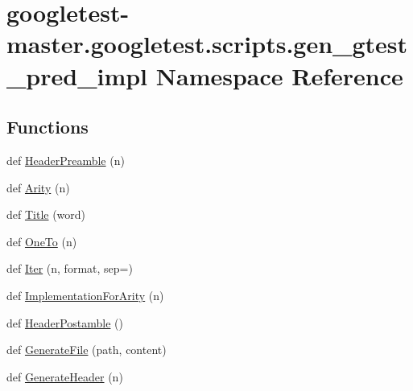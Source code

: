\hypertarget{namespacegoogletest-master_1_1googletest_1_1scripts_1_1gen__gtest__pred__impl}{}\section{googletest-\/master.googletest.\+scripts.\+gen\+\_\+gtest\+\_\+pred\+\_\+impl Namespace Reference}
\label{namespacegoogletest-master_1_1googletest_1_1scripts_1_1gen__gtest__pred__impl}
\subsection*{Functions}
\begin{DoxyCompactItemize}
\item 
def \mbox{\hyperlink{namespacegoogletest-master_1_1googletest_1_1scripts_1_1gen__gtest__pred__impl_a3fc75fccee1b1e6492521b98b6d8ec86}{Header\+Preamble}} (n)
\item 
def \mbox{\hyperlink{namespacegoogletest-master_1_1googletest_1_1scripts_1_1gen__gtest__pred__impl_a2f93487ca4d27fe4f50d4d2819a1e4d2}{Arity}} (n)
\item 
def \mbox{\hyperlink{namespacegoogletest-master_1_1googletest_1_1scripts_1_1gen__gtest__pred__impl_ab0c6365ae868b3a83c97decf01e11657}{Title}} (word)
\item 
def \mbox{\hyperlink{namespacegoogletest-master_1_1googletest_1_1scripts_1_1gen__gtest__pred__impl_a840f7cde355a64a957439f38793fbdff}{One\+To}} (n)
\item 
def \mbox{\hyperlink{namespacegoogletest-master_1_1googletest_1_1scripts_1_1gen__gtest__pred__impl_a62e453d3ebe1044e73975720b0cebea3}{Iter}} (n, format, sep=\textquotesingle{}\textquotesingle{})
\item 
def \mbox{\hyperlink{namespacegoogletest-master_1_1googletest_1_1scripts_1_1gen__gtest__pred__impl_ad838f5c4c75d2b464fb7323caab20883}{Implementation\+For\+Arity}} (n)
\item 
def \mbox{\hyperlink{namespacegoogletest-master_1_1googletest_1_1scripts_1_1gen__gtest__pred__impl_a9a200952da021e4ddf195d1a3589c6a8}{Header\+Postamble}} ()
\item 
def \mbox{\hyperlink{namespacegoogletest-master_1_1googletest_1_1scripts_1_1gen__gtest__pred__impl_af8d9b8820500d6fcf791895a34892931}{Generate\+File}} (path, content)
\item 
def \mbox{\hyperlink{namespacegoogletest-master_1_1googletest_1_1scripts_1_1gen__gtest__pred__impl_affc836dabfcc4b3412ddef93a395c416}{Generate\+Header}} (n)

\end{DoxyCompactItemize}
